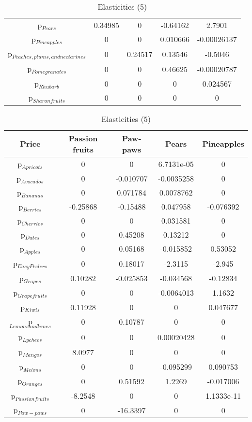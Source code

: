 \documentclass[11pt]{article}
\begin{document}
\begin{table}[h]
\begin{center}
\begin{table}[h]
\begin{center}
\begin{tabular}{ccccc}
p$_{Pears}$ & 0.34985 & 0 & -0.64162 & 2.7901 \\ 
p$_{Pineapples}$ & 0 & 0 & 0.010666 & -0.00026137 \\ 
p$_{Peaches, plums, and nectarines}$ & 0 & 0.24517 & 0.13546 & -0.5046 \\ 
p$_{Pomegranates}$ & 0 & 0 & 0.46625 & -0.00020787 \\ 
p$_{Rhubarb}$ & 0 & 0 & 0 & 0.024567 \\ 
p$_{Sharon fruits}$ & 0 & 0 & 0 & 0 \\ 
\end{tabular}
\end{center}
\end{table}
\begin{table}[h]
\caption{Elasticities (5)}
\label{Table: elasticities 5}
\begin{center}
\begin{tabular}{ccccc}
Price & Passion fruits & Paw-paws & Pears & Pineapples \\ \hline
p$_{Apricots}$ & 0 & 0 & 6.7131e-05 & 0 \\ 
p$_{Avocados}$ & 0 & -0.010707 & -0.0035258 & 0 \\ 
p$_{Bananas}$ & 0 & 0.071784 & 0.0078762 & 0 \\ 
p$_{Berries}$ & -0.25868 & -0.15488 & 0.047958 & -0.076392 \\ 
p$_{Cherries}$ & 0 & 0 & 0.031581 & 0 \\ 
p$_{Dates}$ & 0 & 0.45208 & 0.13212 & 0 \\ 
p$_{Apples}$ & 0 & 0.05168 & -0.015852 & 0.53052 \\ 
p$_{Easy Peelers}$ & 0 & 0.18017 & -2.3115 & -2.945 \\ 
p$_{Grapes}$ & 0.10282 & -0.025853 & -0.034568 & -0.12834 \\ 
p$_{Grapefruits}$ & 0 & 0 & -0.0064013 & 1.1632 \\ 
p$_{Kiwis}$ & 0.11928 & 0 & 0 & 0.047677 \\ 
p$_{Lemons and limes}$ & 0 & 0.10787 & 0 & 0 \\ 
p$_{Lychees}$ & 0 & 0 & 0.00020428 & 0 \\ 
p$_{Mangos}$ & 8.0977 & 0 & 0 & 0 \\ 
p$_{Melons}$ & 0 & 0 & -0.095299 & 0.090753 \\ 
p$_{Oranges}$ & 0 & 0.51592 & 1.2269 & -0.017006 \\ 
p$_{Passion fruits}$ & -8.2548 & 0 & 0 & 1.1333e-11 \\ 
p$_{Paw-paws}$ & 0 & -16.3397 & 0 & 0 \\ 

\end{tabular}
\end{center}
\end{table}
\end{center}
\end{table}
\end{document}
